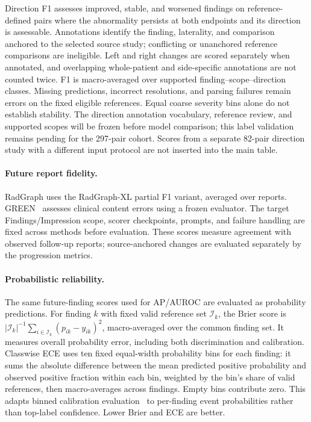 Direction F1 assesses improved, stable, and worsened findings on reference-defined pairs where the abnormality persists at both endpoints and its direction is assessable. Annotations identify the finding, laterality, and comparison anchored to the selected source study; conflicting or unanchored reference comparisons are ineligible. Left and right changes are scored separately when annotated, and overlapping whole-patient and side-specific annotations are not counted twice. F1 is macro-averaged over supported finding--scope--direction classes. Missing predictions, incorrect resolutions, and parsing failures remain errors on the fixed eligible references. Equal coarse severity bins alone do not establish stability. The direction annotation vocabulary, reference review, and supported scopes will be frozen before model comparison; this label validation remains pending for the 297-pair cohort. Scores from a separate 82-pair direction study with a different input protocol are not inserted into the main table.

\paragraph{Future report fidelity.}
RadGraph uses the RadGraph-XL partial F1 variant, averaged over reports. GREEN~\citep{ostmeier2024green} assesses clinical content errors using a frozen evaluator. The target Findings/Impression scope, scorer checkpoints, prompts, and failure handling are fixed across methods before evaluation. These scores measure agreement with observed follow-up reports; source-anchored changes are evaluated separately by the progression metrics.

\paragraph{Probabilistic reliability.}
The same future-finding scores used for AP/AUROC are evaluated as probability predictions. For finding $k$ with fixed valid reference set $\mathcal I_k$, the Brier score is $|\mathcal I_k|^{-1}\sum_{i\in\mathcal I_k}(p_{ik}-y_{ik})^2$, macro-averaged over the common finding set. It measures overall probability error, including both discrimination and calibration. Classwise ECE uses ten fixed equal-width probability bins for each finding: it sums the absolute difference between the mean predicted positive probability and observed positive fraction within each bin, weighted by the bin's share of valid references, then macro-averages across findings. Empty bins contribute zero. This adapts binned calibration evaluation~\citep{guo2017calibration} to per-finding event probabilities rather than top-label confidence. Lower Brier and ECE are better.

